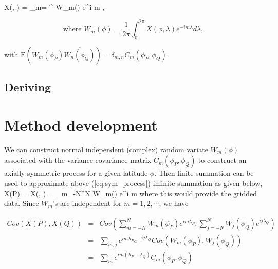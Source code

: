 	\beq \label{eq:sym_process} 
	X(\phi, \lambda) = \sum_{m=-\infty}^{\infty} W_m(\phi) e^{i m \lambda},
	\eeq
			
	\[
		\mbox{where } W_m(\phi) = \frac{1}{2\pi} \int_0^{2\pi} X(\phi, \lambda) e^{-i m \lambda} d \lambda,
	\]
			
	with $\mbox{E}(W_m(\phi_P) \overline{W_n(\phi_Q)}) = \delta_{m,n} C_m(\phi_P, \phi_Q)$. \\
		
	\subsection{Deriving \Cm}
		
			
		
	\section{Method development}
			
			
	We can construct normal independent (complex) random variate $W_m(\phi)$ associated with the variance-covariance matrix $C_m(\phi_P, \phi_Q)$ to construct an axially symmetric process for a given latitude $\phi$. Then finite summation can be used to approximate above (\ref{eq:sym_process}) infinite summation as given below,
	\beq
	X(P) = X(\phi, \lambda) = \sum_{m=-N}^{N} W_m(\phi) e^{i m \lambda}
	\eeq
	where this would provide  the gridded data.
	Since $W_m$'s are independent for $m = 1, 2, \cdots$, we have
			
	\begin{eqnarray*}
		Cov(X(P), {X(Q)}) &=& Cov\left(\sum_{m = -N}^{N} W_m(\phi_P) e^{i m \lambda_P}, \sum_{j=-N}^{N} {W_j(\phi_Q)} e^{i j \lambda_Q}\right) \\
		&=& \sum_{m, j} e^{i m \lambda_P} e^{-i j \lambda_Q} Cov(W_m(\phi_P), {W_j(\phi_Q)}) \\
		&=& \sum_{m} e^{im (\lambda_P - \lambda_Q)} C_m(\phi_P, \phi_Q)
	\end{eqnarray*}
			
